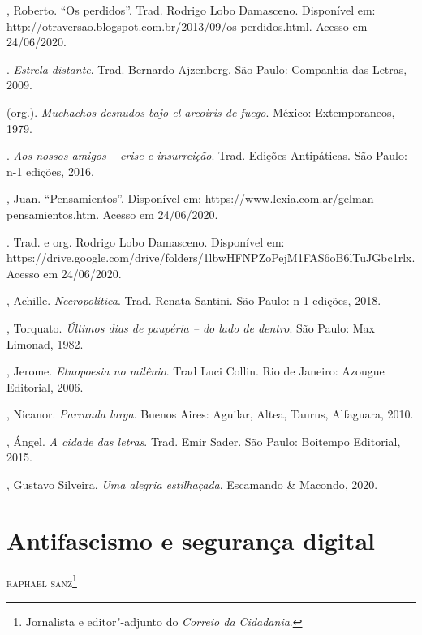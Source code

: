 \begin{bibliohedra}
, Roberto. ``Os perdidos''. Trad. Rodrigo Lobo Damasceno. Disponível
em: http://otraversao.blogspot.com.br/2013/09/os-perdidos.html. Acesso
em 24/06/2020.

\tit{\_\_\_\_\_\_}. \emph{Estrela distante}. Trad. Bernardo Ajzenberg. São
Paulo: Companhia das Letras, 2009.

\tit{\_\_\_\_\_\_} (org.). \emph{Muchachos desnudos bajo el arcoiris de fuego}.
México: Extemporaneos, 1979.

. \emph{Aos nossos amigos -- crise e insurreição}. Trad.
Edições Antipáticas. São Paulo: n-1 edições, 2016.

, Juan. ``Pensamientos''. Disponível em:
https://www.lexia.com.ar/gelman-pensamientos.htm. Acesso em 24/06/2020.

. Trad. e org. Rodrigo Lobo Damasceno. Disponível em:
https://drive.google.com/drive/folders/1lbwHFNPZoPejM1FAS6oB6lTuJGbc1rlx.
Acesso em 24/06/2020.

, Achille. \emph{Necropolítica}. Trad. Renata Santini. São Paulo:
n-1 edições, 2018.

, Torquato. \emph{Últimos dias de paupéria -- do lado de dentro}. São
Paulo: Max Limonad, 1982.

, Jerome. \emph{Etnopoesia no milênio}. Trad Luci Collin. Rio
de Janeiro: Azougue Editorial, 2006.

, Nicanor. \emph{Parranda larga}. Buenos Aires: Aguilar, Altea,
Taurus, Alfaguara, 2010.

, Ángel. \emph{A cidade das letras}. Trad. Emir Sader. São Paulo:
Boitempo Editorial, 2015.

, Gustavo Silveira. \emph{Uma alegria estilhaçada}. Escamando \&
Macondo, 2020.
\end{bibliohedra}

\chapter[Antifascismo e segurança digital]{Antifascismo e segurança digital}

\hfill{}\textsc{raphael sanz}\footnote[\dag]{Jornalista e editor"-adjunto do \emph{Correio da Cidadania}.}

\bigskip

